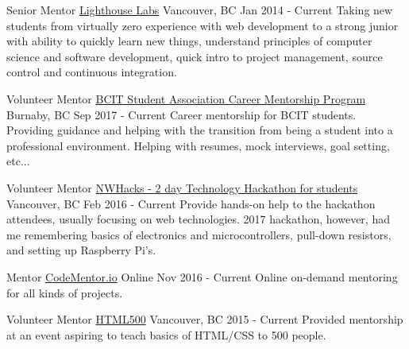 \begin{cventries}
  \cventry
    {Senior Mentor}
    {\href{https://lighthouselabs.ca}{\faGlobe\enspace Lighthouse Labs}}
    {Vancouver, BC}
    {Jan 2014 - Current}
    {
      Taking new students from virtually zero experience with web development to a strong junior with ability to quickly learn new things, understand principles of computer science and software development, quick intro to project management, source control and continuous integration.
    }

  \cventry
    {Volunteer Mentor}
    {\href{https://www.bcitsa.ca/careerservices/mentorship/}{\faGlobe\enspace BCIT Student Association Career Mentorship Program}}
    {Burnaby, BC}
    {Sep 2017 - Current}
    {
      Career mentorship for BCIT students. Providing guidance and helping with the transition from being a student into a professional environment. Helping with resumes, mock interviews, goal setting, etc...
    }

  \cventry
    {Volunteer Mentor}
    {\href{https://nwhacks.io}{\faGlobe\enspace NWHacks - 2 day Technology Hackathon for students}}
    {Vancouver, BC}
    {Feb 2016 - Current}
    {
      Provide hands-on help to the hackathon attendees, usually focusing on web technologies. 2017 hackathon, however, had me remembering basics of electronics and microcontrollers, pull-down resistors, and setting up Raspberry Pi's.
    }
    
  \cventry
    {Mentor}
    {\href{https://www.codementor.io/vasili}{\faGlobe\enspace CodeMentor.io}}
    {Online}
    {Nov 2016 - Current}
    {
      Online on-demand mentoring for all kinds of projects.
    }
    
  \cventry
    {Volunteer Mentor}
    {\href{http://www.thehtml500.com}{\faGlobe\enspace HTML500}}
    {Vancouver, BC}
    {2015 - Current}
    {
      Provided mentorship at an event aspiring to teach basics of HTML/CSS to 500 people.
    }
\end{cventries}